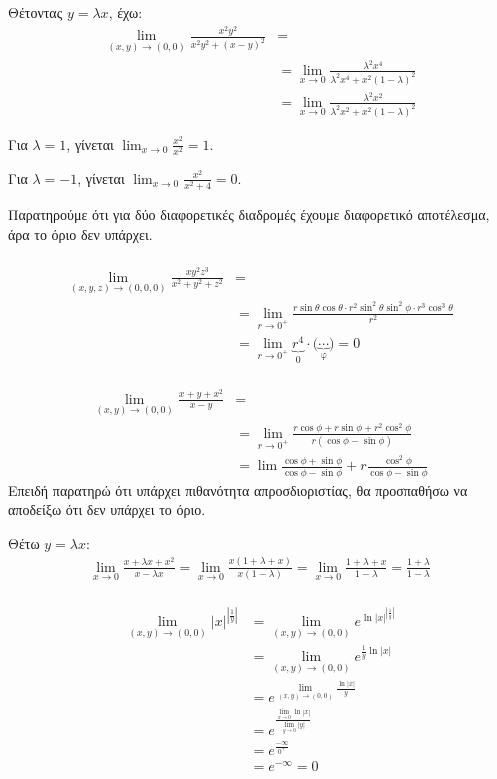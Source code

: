 \documentclass[11pt,a4paper,titlepage]{article}
\begin{document}
Θέτοντας \(y=\lambda x\), έχω:
\begin{align*}
\lim_{(x,y) \to(0,0)} \frac{x^2y^2}{x^2y^2+(x-y)^2}
&= \\ &=
\lim_{x \to 0} \frac{\lambda^2x^4}{\lambda^2x^4+x^2(1-\lambda)^2} \\
&=
\lim_{x \to 0} \frac{\lambda^2x^2}{\lambda^2x^2+x^2(1-\lambda)^2}
\end{align*}

Για \(\lambda=1\), γίνεται \(\lim_{x\to 0} \frac{x^2}{x^2}=1\).

Για \(\lambda=-1\), γίνεται \(\lim_{x\to 0} \frac{x^2}{x^2+4} = 0\).

Παρατηρούμε ότι για δύο διαφορετικές διαδρομές έχουμε διαφορετικό αποτέλεσμα, άρα το όριο δεν υπάρχει.

\paragraph{}
\begin{align*}
\lim_{(x,y,z)\to(0,0,0)} \frac{xy^2z^3}{x^2+y^2+z^2}
&=\\&=
\lim_{r\to0^+} \frac{r\sin\theta\cos\theta \cdot r^2\sin^2\theta\sin^2\phi \cdot r^3\cos^3\theta}{r^2} \\ &=
\lim_{r\to0^+} \underbrace{r^4}_{0} \cdot \big( \underbrace{ \cdots }_\text{φ} \big) = 0
\end{align*}

\paragraph{}
\begin{align*}
\lim_{(x,y)\to(0,0)} \frac{x+y+x^2}{x-y}
&= \\ &=
\lim_{r\to0^+} \frac{r\cos\phi+r\sin\phi+r^2\cos^2\phi}{r(\cos\phi-\sin\phi)}
\\ &= \lim
\frac{\cos\phi+\sin\phi}{\cos\phi-\sin\phi} + r
\frac{\cos^2\phi}{\cos\phi-\sin\phi}
\end{align*}
Επειδή παρατηρώ ότι υπάρχει πιθανότητα απροσδιοριστίας, θα προσπαθήσω να αποδείξω ότι δεν υπάρχει το όριο.

Θέτω \(y = \lambda x\):
\begin{align*}
\lim_{x\to0}\frac{x+\lambda x+x^2}{x-\lambda x} =
\lim_{x\to0}\frac{x(1+\lambda+x)}{x(1-\lambda)} =
\lim_{x\to0}\frac{1+\lambda+x}{1-\lambda} = \frac{1+\lambda}{1-\lambda}
\end{align*}

\paragraph{}
\begin{align*}
\lim_{(x,y)\to(0,0)} |x|^{|\frac{1}{y}|} &=
\lim_{(x,y)\to(0,0)} e^{\ln|x|^{|\frac{1}{y}|}} \\ &=
\lim_{(x,y)\to(0,0)} e^{\frac{1}{y} \ln |x|} \\ &=
e^{  \lim_{(x,y)\to(0,0)} \frac{\ln|x|}{y}   } \\ &=
e^{ \frac{\lim_{x\to0} \ln|x|  }{\lim_{y\to0} |y| }} \\ &=
e^\frac{-\infty}{0^+} \\ &= e^{-\infty} = 0
\end{align*}
\end{document}
